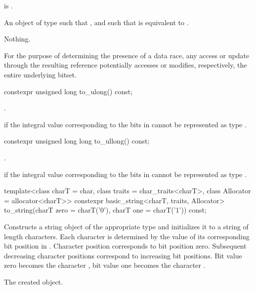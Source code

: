 \begin{itemdescr}
\pnum
\hardexpects
{} is .

\pnum
\returns
An object of type
such that
,
and such that
is equivalent to
.

\pnum
\throws
Nothing.

\pnum
\remarks
For the purpose of determining the presence of a data
race, any access or update through the resulting
reference potentially accesses or modifies, respectively, the entire
underlying bitset.
\end{itemdescr}

%
\begin{itemdecl}
constexpr unsigned long to_ulong() const;
\end{itemdecl}

\begin{itemdescr}
\pnum
\returns
{}.

\pnum
\throws
{}%
 if the integral value 
corresponding to the bits in 
cannot be represented as type .
\end{itemdescr}

%
\begin{itemdecl}
constexpr unsigned long long to_ullong() const;
\end{itemdecl}

\begin{itemdescr}
\pnum
\returns
{}.

\pnum
\throws
{}%
 if the integral value 
corresponding to the bits in 
cannot be represented as type .
\end{itemdescr}

%
\begin{itemdecl}
template<class charT = char,
         class traits = char_traits<charT>,
         class Allocator = allocator<charT>>
  constexpr basic_string<charT, traits, Allocator>
    to_string(charT zero = charT('0'), charT one = charT('1')) const;
\end{itemdecl}

\begin{itemdescr}
\pnum
\effects
Constructs a string object of the appropriate type
and initializes it to a string of length  characters.
Each character is determined by the value of its corresponding bit position in
.
Character position  corresponds to bit position zero.
Subsequent decreasing character positions correspond to increasing bit
positions.
Bit value zero becomes the character ,
bit value one becomes the character
.

\pnum
\returns
The created object.
\end{itemdescr}

